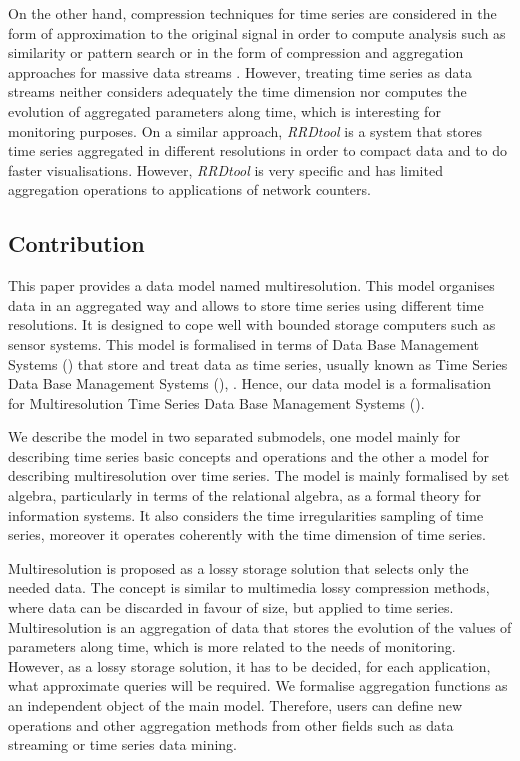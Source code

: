 On the other hand, compression techniques for time series are
considered in the form of approximation to the original signal in
order to compute analysis such as similarity or pattern search
\cite{fu11,keogh01,last01} or in the form of compression and
aggregation approaches for massive data streams
\cite{cormode08:pods,bonnet01}. However, treating time series as data
streams neither considers adequately the time dimension nor computes
the evolution of aggregated parameters along time, which is
interesting for monitoring purposes.  On a similar approach,
\emph{RRDtool} \cite{rrdtool} is a system that stores time series
aggregated in different resolutions in order to compact data and to do
faster visualisations. However, \emph{RRDtool} is very specific and
has limited aggregation operations to applications of network
counters.



\subsection{Contribution}



This paper provides a data model named multiresolution. This model
organises data in an aggregated way and allows to store time series
using different time resolutions. It is designed to cope well with
bounded storage computers such as sensor systems.  This model is
formalised in terms of Data Base Management Systems () that
store and treat data as time series, usually known as Time Series Data
Base Management Systems (), \cite{dreyer94,last01}.  Hence,
our data model is a formalisation for Multiresolution Time Series Data
Base Management Systems ().


We describe the model in two separated submodels, one 
model mainly for describing time series basic concepts and operations
and the other a  model for describing multiresolution over
time series. The model is mainly formalised by set algebra,
particularly in terms of the relational algebra, as a formal theory
for information systems.  It also considers the time irregularities
sampling of time series, moreover it operates coherently with the time
dimension of time series.



Multiresolution is proposed as a lossy storage solution that selects
only the needed data. The concept is similar to multimedia lossy
compression methods, where data can be discarded in favour of size,
but applied to time series.  Multiresolution is an aggregation of data
that stores the evolution of the values of parameters along time,
which is more related to the needs of monitoring. However, as a lossy
storage solution, it has to be decided, for each application, what
approximate queries will be required.  We formalise aggregation
functions as an independent object of the main model. Therefore, users
can define new operations and other aggregation methods from other
fields such as data streaming or time series data mining.



